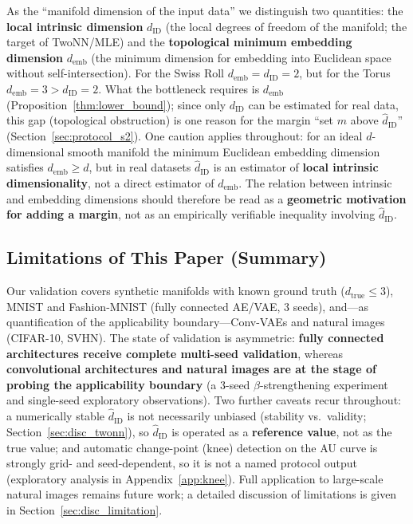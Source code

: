 \documentclass[make,article,submit,pdftex,moreauthors]{Definitions/mdpi}
\newcommand{\dID}{d_{\mathrm{ID}}}
\newcommand{\hatdID}{\hat{d}_{\mathrm{ID}}}
\newcommand{\dtrue}{d_{\mathrm{true}}}
\newcommand{\demb}{d_{\mathrm{emb}}}
\begin{document}
As the ``manifold dimension of the input data'' we distinguish two
quantities:
the \textbf{local intrinsic dimension} $\dID$ (the local degrees of freedom
of the manifold; the target of TwoNN/MLE) and the
\textbf{topological minimum embedding dimension} $\demb$ (the minimum
dimension for embedding into Euclidean space without self-intersection).
For the Swiss Roll $\demb = \dID = 2$, but for the Torus
$\demb = 3 > \dID = 2$.
What the bottleneck requires is $\demb$
(Proposition~\ref{thm:lower_bound}); since only $\dID$ can be estimated for
real data, this gap (topological obstruction) is one reason for the margin
``set $m$ above $\hatdID$'' (Section~\ref{sec:protocol_s2}).
One caution applies throughout: for an ideal $d$-dimensional smooth
manifold the minimum Euclidean embedding dimension satisfies
$\demb \geq d$, but in real datasets $\hatdID$ is an estimator of
\textbf{local intrinsic dimensionality}, not a direct estimator of
$\demb$.
The relation between intrinsic and embedding dimensions should therefore be
read as a \textbf{geometric motivation for adding a margin}, not as an
empirically verifiable inequality involving $\hatdID$.

\subsection{Limitations of This Paper (Summary)}\label{sec:intro_limits}

Our validation covers synthetic manifolds with known ground truth
($\dtrue \leq 3$), MNIST and Fashion-MNIST (fully connected AE/VAE,
3 seeds), and---as quantification of the applicability boundary---Conv-VAEs
and natural images (CIFAR-10, SVHN).
The state of validation is asymmetric: \textbf{fully connected
architectures receive complete multi-seed validation}, whereas
\textbf{convolutional architectures and natural images are at the stage of
probing the applicability boundary} (a 3-seed $\beta$-strengthening
experiment and single-seed exploratory observations).
Two further caveats recur throughout: a numerically stable $\hatdID$ is not
necessarily unbiased (stability vs.\ validity;
Section~\ref{sec:disc_twonn}), so $\hatdID$ is operated as a
\textbf{reference value}, not as the true value; and automatic change-point
(knee) detection on the AU curve is strongly grid- and seed-dependent, so
it is not a named protocol output (exploratory analysis in
Appendix~\ref{app:knee}).
Full application to large-scale natural images remains future work; a
detailed discussion of limitations is given in
Section~\ref{sec:disc_limitation}.
\end{document}
